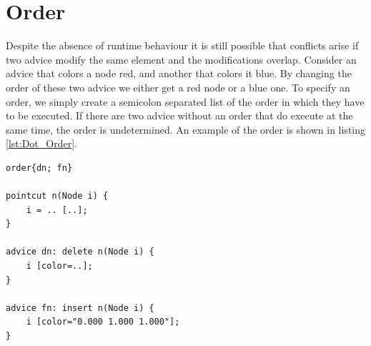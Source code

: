 \documentclass[a4paper]{report}
\begin{document}
\section{Order}
Despite the absence of runtime behaviour it is still possible that conflicts arise if two advice modify the same element and the modifications overlap. Consider an advice that colors a node red, and another that colors it blue. By changing the order of these two advice we either get a red node or a blue one. To specify an order, we simply create a semicolon separated list of the order in which they have to be executed. If there are two advice without an order that do execute at the same time, the order is undetermined. An example of the order is shown in listing \ref{lst:Dot_Order}.
\begin{lstlisting}[caption=An example of the order., label=lst:Dot_Order]
order{dn; fn}

pointcut n(Node i) {
	i = .. [..];
}

advice dn: delete n(Node i) {
	i [color=..];
}

advice fn: insert n(Node i) {
	i [color="0.000 1.000 1.000"];
}
\end{lstlisting}
\end{document}
